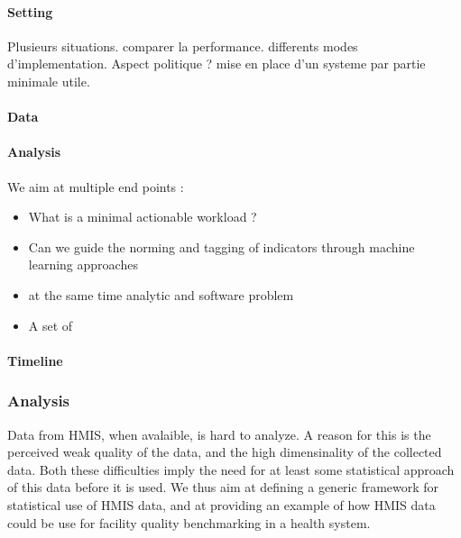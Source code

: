 \documentclass[a4paper,11pt,final,twoside]{article}
\begin{document}
\paragraph{Setting} Plusieurs situations. comparer la performance. differents modes d'implementation.
Aspect politique ? mise en place d'un systeme par partie minimale utile.

\paragraph{Data}

\paragraph{Analysis} We aim at multiple end points :
\begin{itemize}
    \item What is a minimal actionable workload ?
    \item Can we guide the norming and tagging of indicators through machine learning approaches
    \item at the same time analytic and software problem
\end{itemize}

\begin{itemize}
    \item A set of
\end{itemize}

\paragraph{Timeline}


        \subsubsection{Analysis}

Data from HMIS, when avalaible, is hard to analyze. A reason for this is the perceived weak quality of the data, and the high dimensinality of the collected data. Both these difficulties imply the need for at least some statistical approach of this data before it is used. We thus aim at defining a generic framework for statistical use of HMIS data, and at providing an example of how HMIS data could be use for facility quality benchmarking in a health system.
\end{document}
